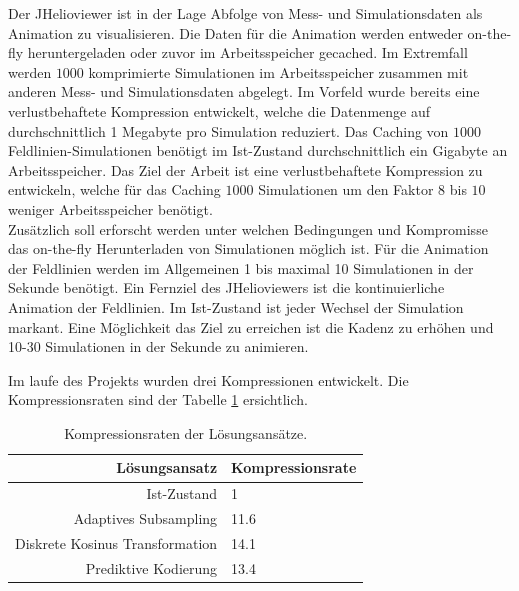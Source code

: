 Der JHelioviewer ist in der Lage Abfolge von Mess- und Simulationsdaten als Animation zu visualisieren. Die Daten für die Animation werden entweder on-the-fly heruntergeladen oder zuvor im Arbeitsspeicher gecached. Im Extremfall werden $1000$ komprimierte Simulationen im Arbeitsspeicher zusammen mit anderen Mess- und Simulationsdaten abgelegt. Im Vorfeld wurde bereits eine verlustbehaftete Kompression entwickelt, welche die Datenmenge auf durchschnittlich 1 Megabyte pro Simulation reduziert. Das Caching von $1000$ Feldlinien-Simulationen benötigt im Ist-Zustand durchschnittlich ein Gigabyte an Arbeitsspeicher. Das Ziel der Arbeit ist eine verlustbehaftete Kompression zu entwickeln, welche für das Caching $1000$ Simulationen um den Faktor $8$ bis $10$ weniger Arbeitsspeicher benötigt.\\
Zusätzlich soll erforscht werden unter welchen Bedingungen und Kompromisse das on-the-fly Herunterladen von Simulationen möglich ist. Für die Animation der Feldlinien werden im Allgemeinen 1 bis maximal 10 Simulationen in der Sekunde benötigt. Ein Fernziel des JHelioviewers ist die kontinuierliche Animation der Feldlinien. Im Ist-Zustand ist jeder Wechsel der Simulation markant. Eine Möglichkeit das Ziel zu erreichen ist die Kadenz zu erhöhen und 10-30 Simulationen in der Sekunde zu animieren.

Im laufe des Projekts wurden drei Kompressionen entwickelt. Die Kompressionsraten sind der Tabelle \ref{einleitung:tabelle} ersichtlich.
\begin{table}[!htbp]
	\center
	\begin{tabular}{r|l}
		Lösungsansatz & Kompressionsrate \\\hline
		Ist-Zustand & 1\\
		Adaptives Subsampling & 11.6 \\
		Diskrete Kosinus Transformation & 14.1 \\
		Prediktive Kodierung & 13.4\\
	\end{tabular}
	\caption{Kompressionsraten der Lösungsansätze.}
	\label{einleitung:tabelle}
\end{table}